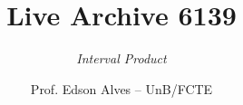 \title{Live Archive 6139}
\subtitle{\textit{Interval Product}}
\author{Prof. Edson Alves -- UnB/FCTE}
\date{}

